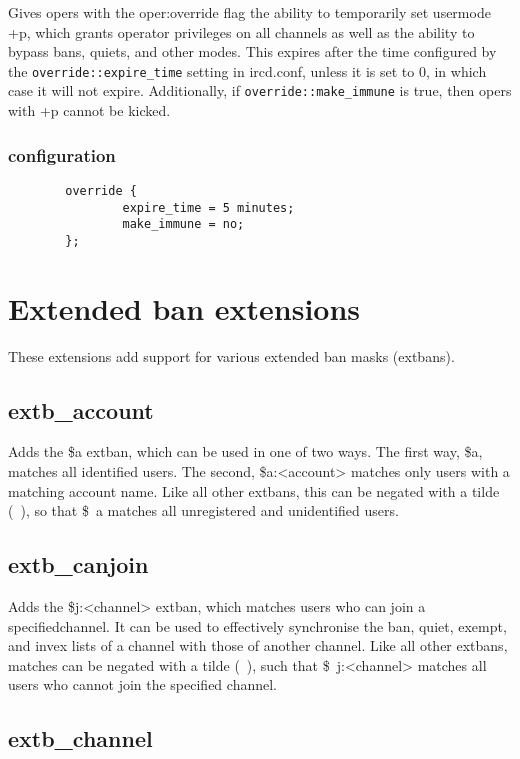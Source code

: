 	Gives opers with the oper:override flag the ability to temporarily set usermode +p,
	which grants operator privileges on all channels as well as the ability to bypass
	bans, quiets, and other modes.  This expires after the time configured by the
	\nolinkurl{override::expire\_time} setting in ircd.conf, unless it is set
	to 0, in which case it will not expire. Additionally, if \nolinkurl{override::make\_immune}
	is true, then opers with +p cannot be kicked.
	\subsubsection{configuration}
		\begin{verbatim}
		override {
		        expire_time = 5 minutes;
		        make_immune = no;
		};
		\end{verbatim}


\section{Extended ban extensions}
\label{extbextensions}

	These extensions add support for various extended ban masks
	(extbans).

\subsection{extb\_account}

	Adds the \$a extban, which can be used in one of two ways.
	The first way, \$a, matches all identified users.  The second,
	\$a:<account> matches only users with a matching account name.
	Like all other extbans, this can be negated with a tilde (~),
	so that \$~a matches all unregistered and unidentified users.

\subsection{extb\_canjoin}

	Adds the \$j:<channel> extban, which matches users who can
	join a specifiedchannel.  It can be used to effectively
	synchronise the ban, quiet, exempt, and invex lists of a channel
	with those of another channel.  Like all other extbans, matches
	can be negated with a tilde (~), such that \$~j:<channel> matches
	all users who cannot join the specified channel.

\subsection{extb\_channel}

